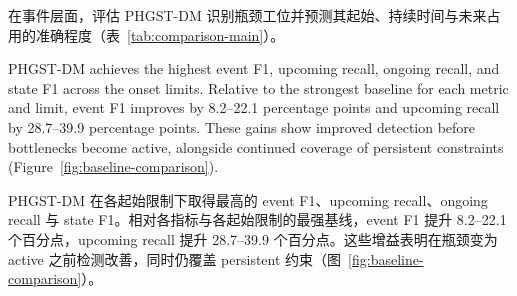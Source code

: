 \documentclass[a4paper,fleqn]{cas-dc}
\newcommand{\zhpara}[1]{%
  \par\begingroup\small\color{black!72}\noindent #1\par\endgroup}
\begin{document}
\zhpara{在事件层面，评估 PHGST-DM 识别瓶颈工位并预测其起始、持续时间与未来占用的准确程度（表~\ref{tab:comparison-main}）。}


PHGST-DM achieves the highest event F1, upcoming recall, ongoing recall, and state F1 across the onset limits. Relative to the strongest baseline for each metric and limit, event F1 improves by 8.2--22.1 percentage points and upcoming recall by 28.7--39.9 percentage points. These gains show improved detection before bottlenecks become active, alongside continued coverage of persistent constraints (Figure~\ref{fig:baseline-comparison}).

\zhpara{PHGST-DM 在各起始限制下取得最高的 event F1、upcoming recall、ongoing recall 与 state F1。相对各指标与各起始限制的最强基线，event F1 提升 8.2--22.1 个百分点，upcoming recall 提升 28.7--39.9 个百分点。这些增益表明在瓶颈变为 active 之前检测改善，同时仍覆盖 persistent 约束（图~\ref{fig:baseline-comparison}）。}
\end{document}

